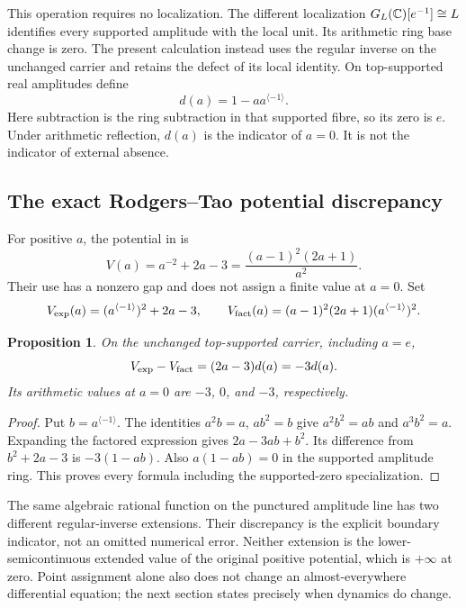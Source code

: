 \documentclass[11pt,a4paper]{article}
\newtheorem{proposition}[theorem]{Proposition}
\theoremstyle{definition}
\newcommand{\rinv}[1]{#1^{\langle-1\rangle}}
\begin{document}
This operation requires no localization. The different localization $G_L(\mathbb C)[e^{-1}]\cong L$ identifies every supported amplitude with the local unit. Its arithmetic ring base change is zero. The present calculation instead uses the regular inverse on the unchanged carrier and retains the defect of its local identity. On top-supported real amplitudes define
\[
 d(a)=1-a\rinv a.
\]
Here subtraction is the ring subtraction in that supported fibre, so its zero is $e$. Under arithmetic reflection, $d(a)$ is the indicator of $a=0$. It is not the indicator of external absence.

\subsection{The exact Rodgers--Tao potential discrepancy}
For positive $a$, the potential in \citet[\S7, Eq.~(62)]{RT} is
\[
 V(a)=a^{-2}+2a-3=\frac{(a-1)^2(2a+1)}{a^2}.
\]
Their use has a nonzero gap and does not assign a finite value at $a=0$. Set
\[
 V_{\rm exp}(a)=(\rinv a)^2+2a-3,
 \qquad V_{\rm fact}(a)=(a-1)^2(2a+1)(\rinv a)^2.
\]
\begin{proposition}\label{prop:potential}
On the unchanged top-supported carrier, including $a=e$,
\begin{equation}\label{eq:pot}
 V_{\rm exp}-V_{\rm fact}=(2a-3)d(a)=-3d(a).
\end{equation}
Its arithmetic values at $a=0$ are $-3$, $0$, and $-3$, respectively.
\end{proposition}
\begin{proof}
Put $b=\rinv a$. The identities $a^2b=a$, $ab^2=b$ give
$a^2b^2=ab$ and $a^3b^2=a$. Expanding the factored expression gives
$2a-3ab+b^2$. Its difference from $b^2+2a-3$ is $-3(1-ab)$.
Also $a(1-ab)=0$ in the supported amplitude ring. This proves every formula including the supported-zero specialization.
\end{proof}

The same algebraic rational function on the punctured amplitude line has two different regular-inverse extensions. Their discrepancy is the explicit boundary indicator, not an omitted numerical error. Neither extension is the lower-semicontinuous extended value of the original positive potential, which is $+\infty$ at zero. Point assignment alone also does not change an almost-everywhere differential equation; the next section states precisely when dynamics do change.
\end{document}
